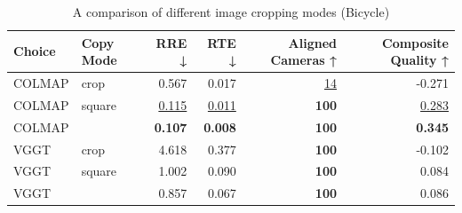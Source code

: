 \begin{table}[H]
\caption{A comparison of different image cropping modes (Bicycle)}
\label{tab:99_copy_mode_bicycle}
\begin{tabular}{llrrrr}
\toprule
Choice & Copy Mode & RRE ↓ & RTE ↓ & Aligned Cameras ↑ & Composite Quality ↑ \\
\midrule
COLMAP & crop & 0.567 & 0.017 & \underline{14} & -0.271 \\
COLMAP & square & \underline{0.115} & \underline{0.011} & \textbf{100} & \underline{0.283} \\
COLMAP &  & \textbf{0.107} & \textbf{0.008} & \textbf{100} & \textbf{0.345} \\
VGGT & crop & 4.618 & 0.377 & \textbf{100} & -0.102 \\
VGGT & square & 1.002 & 0.090 & \textbf{100} & 0.084 \\
VGGT &  & 0.857 & 0.067 & \textbf{100} & 0.086 \\
\bottomrule
\end{tabular}
\end{table}
